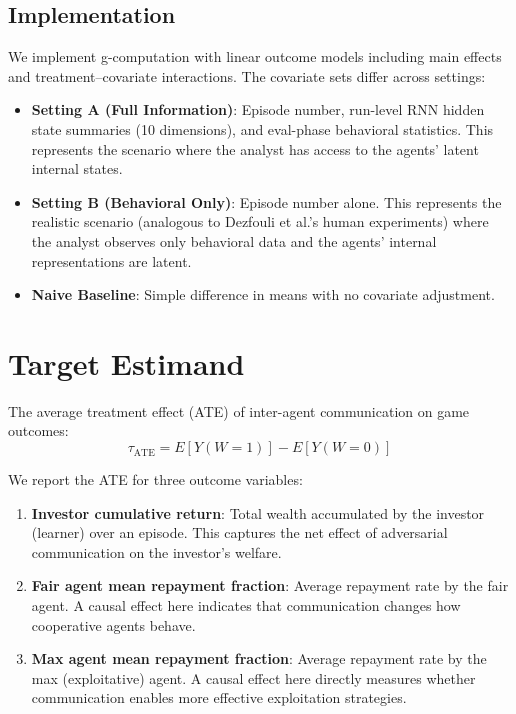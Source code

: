 \documentclass[
]{article}
\providecommand{\tightlist}{%
  \setlength{\itemsep}{0pt}\setlength{\parskip}{0pt}}
\begin{document}
\subsection{Implementation}\label{implementation}

We implement g-computation with linear outcome models including main
effects and treatment--covariate interactions. The covariate sets differ
across settings:

\begin{itemize}
\tightlist
\item
  \textbf{Setting A (Full Information)}: Episode number, run-level RNN
  hidden state summaries (10 dimensions), and eval-phase behavioral
  statistics. This represents the scenario where the analyst has access
  to the agents' latent internal states.
\item
  \textbf{Setting B (Behavioral Only)}: Episode number alone. This
  represents the realistic scenario (analogous to Dezfouli et al.'s
  human experiments) where the analyst observes only behavioral data and
  the agents' internal representations are latent.
\item
  \textbf{Naive Baseline}: Simple difference in means with no covariate
  adjustment.
\end{itemize}

\section{Target Estimand}\label{target-estimand}

The average treatment effect (ATE) of inter-agent communication on game
outcomes: \[\tau_{\text{ATE}} = E[Y(W = 1)] - E[Y(W = 0)]\]

We report the ATE for three outcome variables:

\begin{enumerate}
\def\labelenumi{\arabic{enumi}.}
\tightlist
\item
  \textbf{Investor cumulative return}: Total wealth accumulated by the
  investor (learner) over an episode. This captures the net effect of
  adversarial communication on the investor's welfare.
\item
  \textbf{Fair agent mean repayment fraction}: Average repayment rate by
  the fair agent. A causal effect here indicates that communication
  changes how cooperative agents behave.
\item
  \textbf{Max agent mean repayment fraction}: Average repayment rate by
  the max (exploitative) agent. A causal effect here directly measures
  whether communication enables more effective exploitation strategies.
\end{enumerate}
\end{document}
